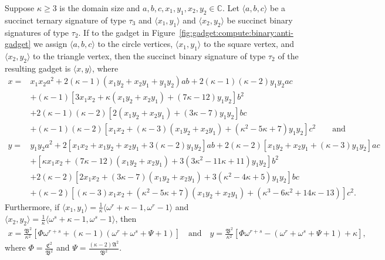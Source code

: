 \documentclass[11pt]{article}
\begin{document}
\begin{lemma} \label{lem:compute:binary:anti-gadget}
 Suppose $\kappa \ge 3$ is the domain size and $a,b,c, x_1, y_1, x_2, y_2 \in \mathbb{C}$.
 Let $\langle a,b,c \rangle$ be a succinct ternary signature of type $\tau_3$ and
 $\langle x_1, y_1 \rangle$ and $\langle x_2, y_2 \rangle$ be succinct binary signatures of type $\tau_2$.
 If to the gadget in Figure~\ref{fig:gadget:compute:binary:anti-gadget}
 we assign $\langle a,b,c \rangle$ to the circle vertices,
 $\langle x_1, y_1 \rangle$ to the square vertex, and
 $\langle x_2, y_2 \rangle$ to the triangle vertex,
 then the succinct binary signature of type $\tau_2$ of the resulting gadget is $\langle x, y \rangle$,
 where
 \begin{align*}
  x = {}&  x_1 x_2 a^2
         + 2 (\kappa - 1) (x_1 y_2 + x_2 y_1 + y_1 y_2) a b
         + 2 (\kappa - 1) (\kappa - 2) y_1 y_2 a c\\
        &+ (\kappa - 1) [3 x_1 x_2 + \kappa (x_1 y_2 + x_2 y_1) + (7 \kappa - 12) y_1 y_2] b^2\\
        &+ 2 (\kappa - 1) (\kappa - 2) [2 (x_1 y_2 + x_2 y_1) + (3 \kappa - 7) y_1 y_2] b c\\
        &+ (\kappa - 1) (\kappa - 2) [x_1 x_2 + (\kappa - 3) (x_1 y_2 + x_2 y_1) + (\kappa^2 - 5 \kappa + 7) y_1 y_2] c^2
       \qquad \text{and}\\
  y = {}&  y_1 y_2 a^2
         + 2 [x_1 x_2 + x_1 y_2 + x_2 y_1 + 3 (\kappa - 2) y_1 y_2] a b
         + 2 (\kappa - 2) [x_1 y_2 + x_2 y_1 + (\kappa - 3) y_1 y_2] a c\\
        &+ [\kappa x_1 x_2 + (7 \kappa - 12) (x_1 y_2 + x_2 y_1) + 3 (3 \kappa^2 - 11 \kappa + 11) y_1 y_2] b^2\\
        &+ 2 (\kappa - 2) [2 x_1 x_2 + (3 \kappa - 7) (x_1 y_2 + x_2 y_1) + 3 (\kappa^2 - 4 \kappa + 5) y_1 y_2] b c\\
        &+ (\kappa - 2) [(\kappa - 3) x_1 x_2 + (\kappa^2 - 5 \kappa + 7) (x_1 y_2 + x_2 y_1) + (\kappa^3 - 6 \kappa^2 + 14 \kappa - 13)] c^2.
 \end{align*}
 Furthermore,
 if $\langle x_1, y_1 \rangle = \frac{1}{\kappa} \langle \omega^r + \kappa - 1, \omega^r - 1 \rangle$
 and $\langle x_2, y_2 \rangle = \frac{1}{\kappa} \langle \omega^s + \kappa - 1, \omega^s - 1 \rangle$,
 then
 \begin{align*}
  x = \frac{\mathfrak{B}^2}{\kappa^2} \left[\Phi \omega^{r+s} + (\kappa - 1) (\omega^r + \omega^s + \Psi + 1)\right]
      \quad \text{and} \quad
  y = \frac{\mathfrak{B}^2}{\kappa^2} \left[\Phi \omega^{r+s} -              (\omega^r + \omega^s + \Psi + 1) + \kappa\right],
 \end{align*}
 where $\Phi = \frac{\mathfrak{C}^2}{\mathfrak{B}^2}$ and $\Psi = \frac{(\kappa - 2) \mathfrak{A}^2}{\mathfrak{B}^2}$.
\end{lemma}
\end{document}
